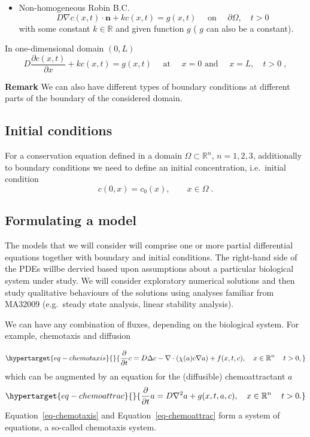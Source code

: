 \documentclass[
  letterpaper,
  DIV=11,
  numbers=noendperiod]{scrreprt}
\providecommand{\tightlist}{%
  \setlength{\itemsep}{0pt}\setlength{\parskip}{0pt}}\usepackage{longtable,booktabs,array}
\theoremstyle{definition}
\theoremstyle{plain}
\theoremstyle{plain}
\theoremstyle{remark}
\begin{document}
\begin{itemize}
\tightlist
\item
  Non-homogeneous Robin B.C. \[
  D\nabla c(x,t)  \cdot {\mathbf{n}}  + k c(x,t)  = g(x,t)  \quad \text{ on } \quad \partial \Omega, \quad t >0 
  \] with some constant \(k \in \mathbb R\) and given function \(g\) (
  \(g\) can also be a constant).
\end{itemize}

In one-dimensional domain \((0,L)\) \[
D \frac{\partial c(x,t)}{\partial x}  + k c(x,t) = g(x,t)  \quad \text{ at } \quad x=0  \text{ and } \quad x= L, \quad t >0 \; , 
\]

\textbf{Remark} We can also have different types of boundary conditions
at different parts of the boundary of the considered domain.

\hypertarget{initial-conditions}{%
\subsection{Initial conditions}\label{initial-conditions}}

For a conservation equation defined in a domain
\(\Omega \subset \mathbb R^n\), \(n=1,2,3\), additionally to boundary
conditions we need to define an initial concentration, i.e.~initial
condition \[
c(0,x) = c_0(x) , \qquad x \in \Omega  \; . 
\]

\hypertarget{formulating-a-model}{%
\subsection{Formulating a model}\label{formulating-a-model}}

The models that we will consider will comprise one or more partial
differential equations together with boundary and initial conditions.
The right-hand side of the PDEs willbe dervied based upon assumptions
about a particular biological system under study. We will consider
exploratory numerical solutions and then study qualitative behaviours of
the solutions using analyses familiar from MA32009 (e.g.~steady state
analysis, linear stability analysis).

We can have any combination of fluxes, depending on the biological
system. For example, chemotaxis and diffusion

\begin{equation}\protect\hypertarget{eq-chemotaxis}{}{
\frac{\partial}{\partial t} c = D \Delta c -\nabla \cdot (\chi(a) c \nabla a )  + f(x,t ,c),
\quad x\in \mathbb R^n \,  \quad t >0, 
}\label{eq-chemotaxis}\end{equation} which can be augmented by an
equation for the (diffusible) chemoattractant \(a\)
\begin{equation}\protect\hypertarget{eq-chemoattrac}{}{
\frac{\partial}{\partial t} a = D \nabla^2 a + g(x,t ,a, c),
\quad x\in \mathbb R^n \,  \quad t >0. 
}\label{eq-chemoattrac}\end{equation} Equation~\ref{eq-chemotaxis} and
Equation~\ref{eq-chemoattrac} form a system of equations, a so-called
chemotaxis system.
\end{document}
